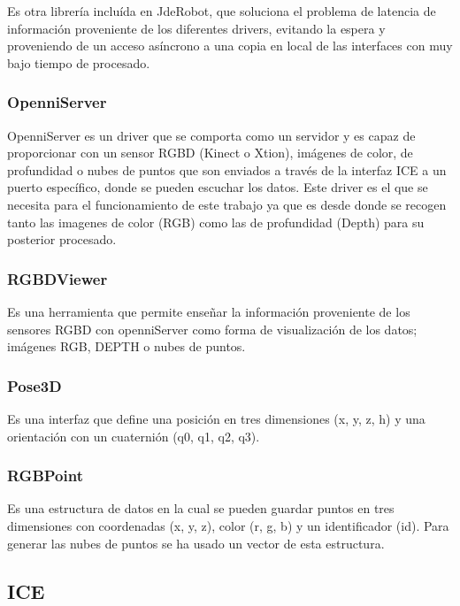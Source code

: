 Es otra librería incluída en JdeRobot, que soluciona el problema de latencia de información proveniente de los diferentes drivers, evitando la espera y proveniendo de un acceso asíncrono a una copia en local de las interfaces con muy bajo tiempo de procesado.

\subsubsection{OpenniServer}

OpenniServer es un driver que se comporta como un servidor y es capaz de proporcionar con un sensor RGBD (Kinect o Xtion), imágenes de color, de profundidad o nubes de puntos que son enviados a través de la interfaz ICE a un puerto específico, donde se pueden escuchar los datos. Este driver es el que se necesita para el funcionamiento de este trabajo ya que es desde donde se recogen tanto las imagenes de color (RGB) como las de profundidad (Depth) para su posterior procesado.

\subsubsection{RGBDViewer}

Es una herramienta que permite enseñar la información proveniente de los sensores RGBD con openniServer como forma de visualización de los datos; imágenes RGB, DEPTH o nubes de puntos.

\subsubsection{Pose3D}

Es una interfaz que define una posición en tres dimensiones (x, y, z, h) y una orientación con un cuaternión (q0, q1, q2, q3).

\subsubsection{RGBPoint}

Es una estructura de datos en la cual se pueden guardar puntos en tres dimensiones con coordenadas (x, y, z), color (r, g, b) y un identificador (id). 
Para generar las nubes de puntos se ha usado un vector de esta estructura.

\subsection{ICE}

